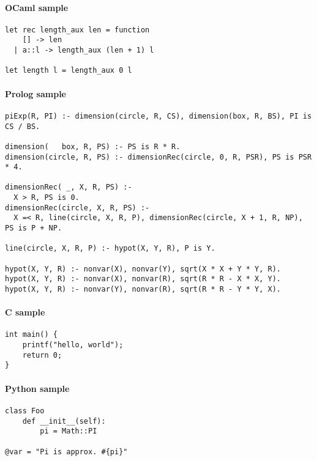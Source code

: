\documentclass[lecture=thpr]{ensldocument}
\begin{document}
\paragraph{OCaml sample}

\begin{verbatim}
let rec length_aux len = function
    [] -> len
  | a::l -> length_aux (len + 1) l

let length l = length_aux 0 l
\end{verbatim}

\paragraph{Prolog sample}

\begin{verbatim}
piExp(R, PI) :- dimension(circle, R, CS), dimension(box, R, BS), PI is CS / BS.

dimension(   box, R, PS) :- PS is R * R.
dimension(circle, R, PS) :- dimensionRec(circle, 0, R, PSR), PS is PSR * 4.

dimensionRec( _, X, R, PS) :-
  X > R, PS is 0.
dimensionRec(circle, X, R, PS) :-
  X =< R, line(circle, X, R, P), dimensionRec(circle, X + 1, R, NP), PS is P + NP.

line(circle, X, R, P) :- hypot(X, Y, R), P is Y.

hypot(X, Y, R) :- nonvar(X), nonvar(Y), sqrt(X * X + Y * Y, R).
hypot(X, Y, R) :- nonvar(X), nonvar(R), sqrt(R * R - X * X, Y).
hypot(X, Y, R) :- nonvar(Y), nonvar(R), sqrt(R * R - Y * Y, X).
\end{verbatim}

\paragraph{C sample}

\begin{verbatim}
int main() {
    printf("hello, world");
    return 0;
}
\end{verbatim}

\paragraph{Python sample}

\begin{verbatim}
class Foo
    def __init__(self):
        pi = Math::PI

@var = "Pi is approx. #{pi}"
\end{verbatim}

\blinddocument
\end{document}
